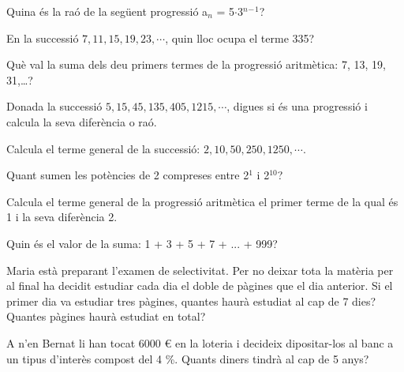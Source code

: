 \pagebreak
\begin{autoaval}{32}

\begin{mylist}

\exer[2]  Quina és la raó de la següent progressió a${}_{ n}$ = 5$\cdot$3\textit{${}^{n}$}${}^{-}$${}^{1}$?

\exer[2]  En la successió $7, 11, 15, 19, 23, \cdots$, quin lloc ocupa el terme 335?

\exer[2]  Què val la suma dels deu primers termes de la progressió aritmètica: 7, 13, 19, 31,{\dots}?
 
\exer[2]  Donada la successió $5, 15, 45, 135, 405, 1215, \cdots$, digues si és una progressió i calcula la seva diferència o raó.

\exer[2]  Calcula el terme general de la successió: $2, 10, 50, 250, 1250, \cdots$.

\exer[2] Quant sumen les potències de 2 compreses entre 2${}^{1}$ i 2${}^{10}$?
 
\exer[2]  Calcula el terme general de la progressió aritmètica el primer terme de la qual és 1 i la seva diferència 2.

\exer[2]  Quin és el valor de la suma: 1 + 3 + 5 + 7 + ... + 999?
 
\exer[2]  Maria està preparant l'examen de selectivitat. Per no deixar tota la matèria per al final ha decidit estudiar cada dia el doble de pàgines que el dia anterior. Si el primer dia va estudiar tres pàgines, quantes haurà estudiat al cap de 7 dies? Quantes pàgines haurà estudiat en total?
 
\exer[2]  A n'en Bernat li han tocat 6000 \euro{} en la loteria i decideix dipositar-los al banc a un tipus d'interès compost del 4 \%. Quants diners tindrà al cap de 5 anys?

\end{mylist}

\end{autoaval}

\vsoo

